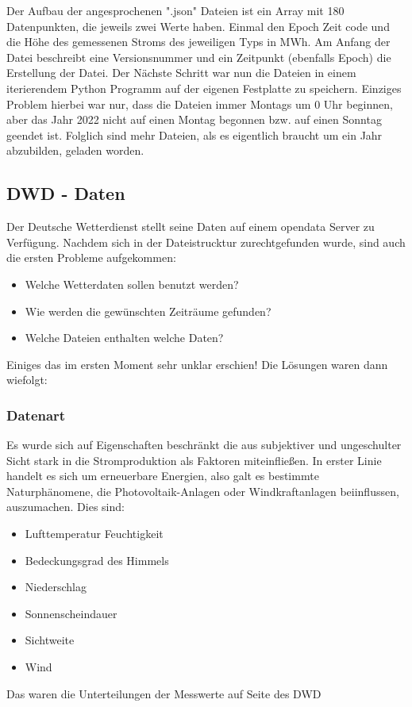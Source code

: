 \documentclass[letterpaper]{article} %
\begin{document}
        Der Aufbau der angesprochenen ".json" Dateien ist ein Array mit 180 Datenpunkten, die jeweils zwei Werte haben. Einmal den Epoch Zeit code und die Höhe des gemessenen Stroms des jeweiligen Typs in MWh. Am Anfang der Datei beschreibt eine Versionsnummer und ein Zeitpunkt (ebenfalls Epoch) die Erstellung der Datei.
        Der Nächste Schritt war nun die Dateien in einem iterierendem Python Programm auf der eigenen Festplatte zu speichern. Einziges Problem hierbei war nur, dass die Dateien immer Montags um 0 Uhr beginnen, aber das Jahr 2022 nicht auf einen Montag begonnen bzw. auf einen Sonntag geendet ist. Folglich sind mehr Dateien, als es eigentlich braucht um ein Jahr abzubilden, geladen worden.
 
    \subsection*{DWD - Daten}
        Der Deutsche Wetterdienst stellt seine Daten auf einem opendata Server zu Verfügung. Nachdem sich in der Dateistrucktur zurechtgefunden wurde, sind auch die ersten Probleme aufgekommen:
        \begin{itemize}
            \item Welche Wetterdaten sollen benutzt werden?
            \item Wie werden die gewünschten Zeiträume gefunden?
            \item Welche Dateien enthalten welche Daten?
        \end{itemize}
        Einiges das im ersten Moment sehr unklar erschien! Die Lösungen waren dann wiefolgt:
            \subsubsection*{Datenart}
                Es wurde sich auf Eigenschaften beschränkt die aus subjektiver und ungeschulter Sicht stark in die Stromproduktion als Faktoren miteinfließen. In erster Linie handelt es sich um erneuerbare Energien, also galt es bestimmte Naturphänomene, die Photovoltaik-Anlagen oder Windkraftanlagen beiinflussen, auszumachen. Dies sind:
                \begin{itemize}
                    \item Lufttemperatur Feuchtigkeit
                    \item Bedeckungsgrad des Himmels
                    \item Niederschlag
                    \item Sonnenscheindauer
                    \item Sichtweite
                    \item Wind
                \end{itemize}
                Das waren die Unterteilungen der Messwerte auf Seite des DWD
\end{document}
